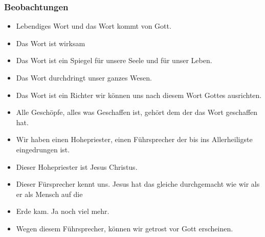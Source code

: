 \documentclass[12pt]{../../inc/mybib}
\begin{document}
\subsubsection{Beobachtungen}
\begin{itemize}
    \item Lebendiges Wort und das Wort kommt von Gott.
    \item Das Wort ist wirksam
    \item Das Wort ist ein Spiegel für unsere Seele und für unser Leben.
    \item Das Wort durchdringt unser ganzes Wesen.
    \item Das Wort ist ein Richter wir können uns nach diesem Wort Gottes ausrichten.
    \item Alle Geschöpfe, alles was Geschaffen ist, gehört dem der das Wort geschaffen hat.
    \item Wir haben einen Hohepriester, einen Führsprecher der bis ins Allerheiligste eingedrungen ist.
    \item Dieser Hohepriester ist Jesus Christus.
    \item Dieser Fürsprecher kennt uns. Jesus hat das gleiche durchgemacht wie wir als er als Mensch auf die \item Erde kam. Ja noch viel mehr.
\item Wegen diesem Führsprecher, können wir getrost vor Gott erscheinen.
\end{itemize}
\end{document}
